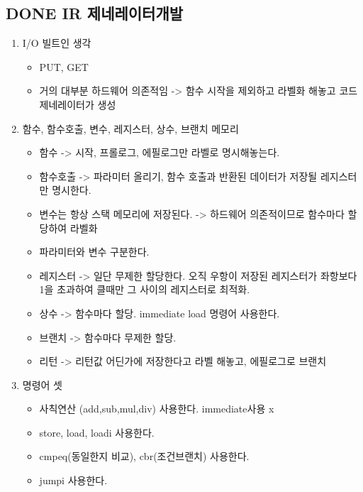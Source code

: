 \documentclass[11pt]{article}
\begin{document}
\subsection{{\bfseries\sffamily DONE} IR 제네레이터개발}
\label{sec:org61a5541}
\begin{enumerate}
\item I/O 빌트인 생각
\begin{itemize}
\item PUT, GET
\item 거의 대부분 하드웨어 의존적임 -> 함수 시작을 제외하고 라벨화 해놓고 코드 제네레이터가 생성
\end{itemize}
\item 함수, 함수호출, 변수, 레지스터, 상수, 브랜치 메모리
\begin{itemize}
\item 함수 -> 시작, 프롤로그, 에필로그만 라벨로 명시해놓는다.
\item 함수호출 -> 파라미터 올리기, 함수 호출과 반환된 데이터가 저장될 레지스터만 명시한다.
\item 변수는 항상 스택 메모리에 저장된다. -> 하드웨어 의존적이므로 함수마다 할당하여 라벨화
\item 파라미터와 변수 구분한다.
\item 레지스터 -> 일단 무제한 할당한다. 오직 우항이 저장된 레지스터가 좌항보다 1을 초과하여 클때만 그 사이의 레지스터로 최적화.
\item 상수 -> 함수마다 할당. immediate load 명령어 사용한다.
\item 브랜치 -> 함수마다 무제한 할당.
\item 리턴 -> 리턴값 어딘가에 저장한다고 라벨 해놓고, 에필로그로 브랜치
\end{itemize}
\item 명령어 셋
\begin{itemize}
\item 사칙연산 (add,sub,mul,div) 사용한다. immediate사용 x
\item store, load, loadi 사용한다.
\item cmpeq(동일한지 비교), cbr(조건브랜치) 사용한다.
\item jumpi 사용한다.
\end{itemize}
\end{enumerate}
\end{document}
